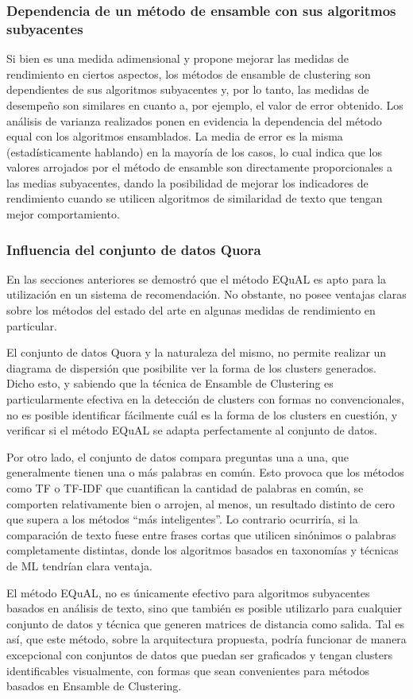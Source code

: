 \subsubsection{Dependencia de un método de ensamble con sus algoritmos subyacentes}
Si bien es una medida adimensional y propone mejorar las medidas de rendimiento en ciertos aspectos, los métodos de ensamble de clustering son dependientes de sus algoritmos subyacentes y, por lo tanto, las medidas de desempeño son similares en cuanto a, por ejemplo, el valor de error obtenido. Los análisis de varianza realizados ponen en evidencia la dependencia del método equal con los algoritmos ensamblados. La media de error es la misma (estadísticamente hablando) en la mayoría de los casos, lo cual indica que los valores arrojados por el método de ensamble son directamente proporcionales a las medias subyacentes, dando la posibilidad de mejorar los indicadores de rendimiento cuando se utilicen algoritmos de similaridad de texto que tengan mejor comportamiento.

\subsubsection{Influencia del conjunto de datos Quora}
En las secciones anteriores se demostró que el método EQuAL es apto para la utilización en un sistema de recomendación. No obstante, no posee ventajas claras sobre los métodos del estado del arte en algunas medidas de rendimiento en particular.

\bigskip El conjunto de datos Quora y la naturaleza del mismo, no permite realizar un diagrama de dispersión que posibilite ver la forma de los clusters generados. Dicho esto, y sabiendo que la técnica de Ensamble de Clustering es particularmente efectiva en la detección de clusters con formas no convencionales, no es posible identificar fácilmente cuál es la forma de los clusters en cuestión, y verificar si el método EQuAL se adapta perfectamente al conjunto de datos.

\bigskip Por otro lado, el conjunto de datos compara preguntas una a una, que generalmente tienen una o más palabras en común. Esto provoca que los métodos como TF o TF-IDF que cuantifican la cantidad de palabras en común, se comporten relativamente bien o arrojen, al menos, un resultado distinto de cero que supera a los métodos “más inteligentes”. Lo contrario ocurriría, si la comparación de texto fuese entre frases cortas que utilicen sinónimos o palabras completamente distintas, donde los algoritmos basados en taxonomías y técnicas de ML tendrían clara ventaja.

\bigskip El método EQuAL, no es únicamente efectivo para algoritmos subyacentes basados en análisis de texto, sino que también es posible utilizarlo para cualquier conjunto de datos y técnica que generen matrices de distancia como salida. Tal es así, que este método, sobre la arquitectura propuesta, podría funcionar de manera excepcional con conjuntos de datos que puedan ser graficados y tengan clusters identificables visualmente, con formas que sean convenientes para métodos basados en Ensamble de Clustering.
